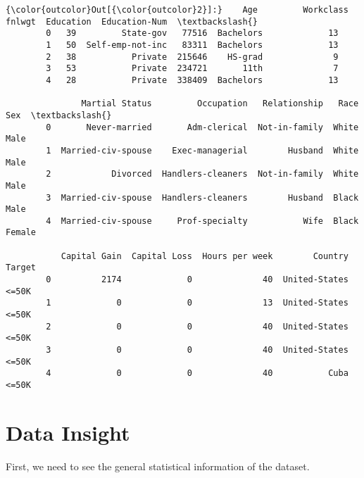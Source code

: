 \documentclass{report}
\begin{document}
\begin{Verbatim}[commandchars=\\\{\}]
{\color{outcolor}Out[{\color{outcolor}2}]:}    Age         Workclass  fnlwgt  Education  Education-Num  \textbackslash{}
        0   39         State-gov   77516  Bachelors             13   
        1   50  Self-emp-not-inc   83311  Bachelors             13   
        2   38           Private  215646    HS-grad              9   
        3   53           Private  234721       11th              7   
        4   28           Private  338409  Bachelors             13   
        
               Martial Status         Occupation   Relationship   Race     Sex  \textbackslash{}
        0       Never-married       Adm-clerical  Not-in-family  White    Male   
        1  Married-civ-spouse    Exec-managerial        Husband  White    Male   
        2            Divorced  Handlers-cleaners  Not-in-family  White    Male   
        3  Married-civ-spouse  Handlers-cleaners        Husband  Black    Male   
        4  Married-civ-spouse     Prof-specialty           Wife  Black  Female   
        
           Capital Gain  Capital Loss  Hours per week        Country Target  
        0          2174             0              40  United-States  <=50K  
        1             0             0              13  United-States  <=50K  
        2             0             0              40  United-States  <=50K  
        3             0             0              40  United-States  <=50K  
        4             0             0              40           Cuba  <=50K  
\end{Verbatim}
            
\section{Data Insight}\label{data-insight}

First, we need to see the general statistical information of the
dataset.
\end{document}
